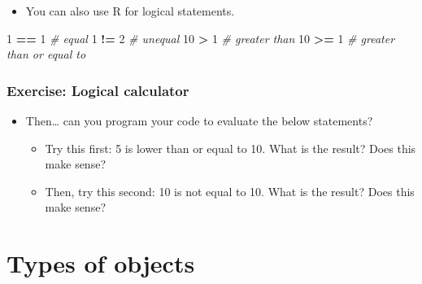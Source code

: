 \documentclass[
]{book}
\newenvironment{Shaded}{\begin{snugshade}}{\end{snugshade}}
\newcommand{\CommentTok}[1]{\textcolor[rgb]{0.56,0.35,0.01}{\textit{#1}}}
\newcommand{\DecValTok}[1]{\textcolor[rgb]{0.00,0.00,0.81}{#1}}
\newcommand{\SpecialCharTok}[1]{\textcolor[rgb]{0.81,0.36,0.00}{\textbf{#1}}}
\providecommand{\tightlist}{%
  \setlength{\itemsep}{0pt}\setlength{\parskip}{0pt}}
\begin{document}
\begin{itemize}
\tightlist
\item
  You can also use R for logical statements.
\end{itemize}

\begin{Shaded}
\begin{Highlighting}[]
\DecValTok{1} \SpecialCharTok{==} \DecValTok{1} \CommentTok{\# equal}
\DecValTok{1} \SpecialCharTok{!=} \DecValTok{2} \CommentTok{\# unequal}
\DecValTok{10} \SpecialCharTok{\textgreater{}} \DecValTok{1} \CommentTok{\# greater than}
\DecValTok{10} \SpecialCharTok{\textgreater{}=} \DecValTok{1} \CommentTok{\# greater than or equal to}
\end{Highlighting}
\end{Shaded}

\subsubsection{Exercise: Logical calculator}\label{exercise-logical-calculator}

\begin{itemize}
\tightlist
\item
  Then\ldots{} can you program your code to evaluate the below statements?

  \begin{itemize}
  \tightlist
  \item
    Try this first: 5 is lower than or equal to 10. What is the result? Does this make sense?
  \item
    Then, try this second: 10 is not equal to 10. What is the result? Does this make sense?
  \end{itemize}
\end{itemize}

\section{Types of objects}\label{types-of-objects}
\end{document}
